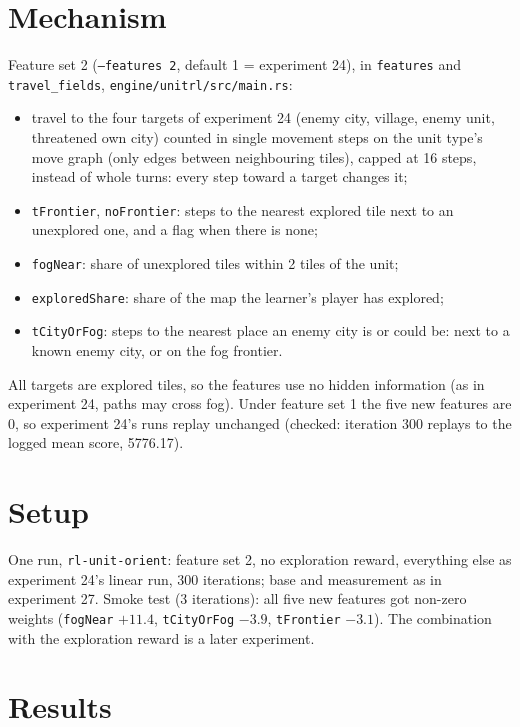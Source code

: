\documentclass{../polyexp}
\begin{document}
\section{Mechanism}
Feature set 2 (\texttt{--features 2}, default 1 = experiment 24), in \texttt{features} and \texttt{travel\_fields},
\texttt{engine/unitrl/src/main.rs}:
\begin{itemize}
\item travel to the four targets of experiment 24 (enemy city, village, enemy unit, threatened own city) counted in
  single movement steps on the unit type's move graph (only edges between neighbouring tiles), capped at 16 steps,
  instead of whole turns: every step toward a target changes it;
\item \texttt{tFrontier}, \texttt{noFrontier}: steps to the nearest explored tile next to an unexplored one, and a
  flag when there is none;
\item \texttt{fogNear}: share of unexplored tiles within 2 tiles of the unit;
\item \texttt{exploredShare}: share of the map the learner's player has explored;
\item \texttt{tCityOrFog}: steps to the nearest place an enemy city is or could be: next to a known enemy city, or on
  the fog frontier.
\end{itemize}
All targets are explored tiles, so the features use no hidden information (as in experiment 24, paths may cross
fog). Under feature set 1 the five new features are 0, so experiment 24's runs replay unchanged (checked: iteration
300 replays to the logged mean score, 5776.17).

\section{Setup}
One run, \texttt{rl-unit-orient}: feature set 2, no exploration reward, everything else as experiment 24's linear
run, 300 iterations; base and measurement as in experiment 27. Smoke test (3 iterations): all five new features got
non-zero weights (\texttt{fogNear} $+11.4$, \texttt{tCityOrFog} $-3.9$, \texttt{tFrontier} $-3.1$).
The combination with the exploration reward is a later experiment.

\section{Results}
\ExpResults
\end{document}
